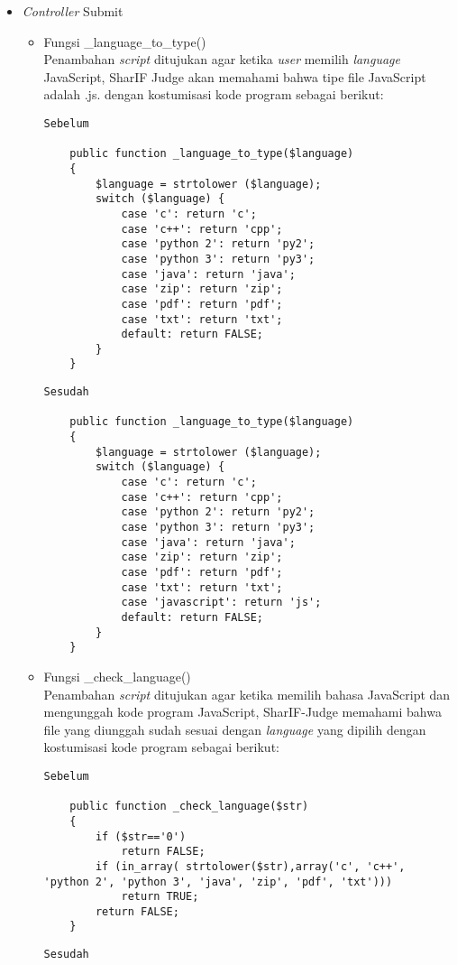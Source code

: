  \begin{itemize}
     \item \textit{Controller} Submit
     \begin{itemize}
        \item Fungsi \_language\_to\_type()\\ Penambahan \textit{script} ditujukan agar ketika \textit{user} memilih \textit{language} JavaScript, SharIF Judge akan memahami bahwa tipe file JavaScript adalah .js. dengan kostumisasi kode program sebagai berikut: 

         \begin{lstlisting}[basicstyle=\ttfamily, frame=single,
    columns=fullflexible, breaklines=true, numbers=none]
Sebelum

	public function _language_to_type($language)
	{
		$language = strtolower ($language);
		switch ($language) {
			case 'c': return 'c';
			case 'c++': return 'cpp';
			case 'python 2': return 'py2';
			case 'python 3': return 'py3';
			case 'java': return 'java';
			case 'zip': return 'zip';
			case 'pdf': return 'pdf';
			case 'txt': return 'txt';
			default: return FALSE;
		}
	}
    \end{lstlisting}
         \begin{lstlisting}[basicstyle=\ttfamily, frame=single,
    columns=fullflexible, breaklines=true, numbers=none]
Sesudah

	public function _language_to_type($language)
	{
		$language = strtolower ($language);
		switch ($language) {
			case 'c': return 'c';
			case 'c++': return 'cpp';
			case 'python 2': return 'py2';
			case 'python 3': return 'py3';
			case 'java': return 'java';
			case 'zip': return 'zip';
			case 'pdf': return 'pdf';
			case 'txt': return 'txt';
			case 'javascript': return 'js';
			default: return FALSE;
		}
	}
    \end{lstlisting}
        
         \item Fungsi \_check\_language()\\
         Penambahan \textit{script} ditujukan agar ketika memilih bahasa JavaScript dan mengunggah kode program JavaScript, SharIF-Judge memahami bahwa file yang diunggah sudah sesuai dengan \textit{language} yang dipilih dengan kostumisasi kode program sebagai berikut:
          \begin{lstlisting}[basicstyle=\ttfamily, frame=single,
    columns=fullflexible, breaklines=true, numbers=none]
Sebelum

	public function _check_language($str)
	{
		if ($str=='0')
			return FALSE;
		if (in_array( strtolower($str),array('c', 'c++', 'python 2', 'python 3', 'java', 'zip', 'pdf', 'txt')))
			return TRUE;
		return FALSE;
	}
    \end{lstlisting}
        \begin{lstlisting}[basicstyle=\ttfamily, frame=single,
    columns=fullflexible, breaklines=true, numbers=none]
Sesudah


\end{lstlisting}
\end{itemize}
\end{itemize}
